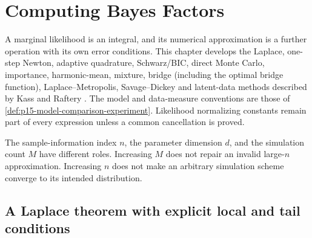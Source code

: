 \chapter{Computing Bayes Factors}
\label{sec:p15-bayes-factor-computation}

A marginal likelihood is an integral, and its numerical approximation is
a further operation with its own error conditions. This chapter develops
the Laplace, one-step Newton, adaptive quadrature, Schwarz/BIC, direct
Monte Carlo, importance, harmonic-mean, mixture, bridge (including the
optimal bridge function), Laplace--Metropolis, Savage--Dickey and
latent-data methods described by Kass and Raftery
\cite[Sec.~4, pp.~777--781]{KassRaftery1995BayesFactors}.
The model and data-measure conventions are those of
\cref{def:p15-model-comparison-experiment}. Likelihood normalizing constants
remain part of every expression unless a common cancellation is proved.

The sample-information index \(n\), the parameter dimension \(d\), and the
simulation count \(M\) have different roles. Increasing \(M\) does not repair
an invalid large-\(n\) approximation. Increasing \(n\) does not make an
arbitrary simulation scheme converge to its intended distribution.

\section{A Laplace theorem with explicit local and tail conditions}
\label{sec:p15-laplace-hypotheses}


